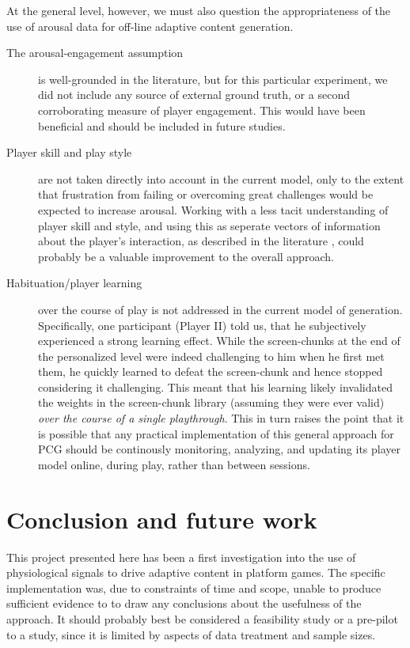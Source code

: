 \documentclass{llncs}
\begin{document}
At the general level, however, we must also question the appropriateness of the use of arousal data for off-line adaptive content generation.
\begin{description}
\item [The arousal-engagement assumption] is well-grounded in the literature, but for this particular experiment, we did not include any source of external ground truth, or a second corroborating measure of player engagement. This would have been beneficial and should be included in future studies.
\item [Player skill and play style] are not taken directly into account in the current model, only to the extent that frustration from failing or overcoming great challenges would be expected to increase arousal. Working with a less tacit understanding of player skill and style, and using this as seperate vectors of information about the player's interaction, as described in the literature \cite{shaker2010towards}, could probably be a valuable improvement to the overall approach.
\item [Habituation/player learning] over the course of play is not addressed in the current model of generation. Specifically, one participant (Player II) told us, that he subjectively experienced a strong learning effect. While the screen-chunks at the end of the personalized level were indeed challenging to him when he first met them, he quickly learned to defeat the screen-chunk and hence stopped considering it challenging. This meant that his learning likely invalidated the weights in the screen-chunk library (assuming they were ever valid) \emph{over the course of a single playthrough}.
This in turn raises the point that it is possible that any practical implementation of this general approach for PCG should be continously monitoring, analyzing, and updating its player model online, during play, rather than between sessions.
\end{description}

\section{Conclusion and future work}
This project presented here has been a first investigation into the use of physiological signals to drive adaptive content in platform games.
The specific implementation was, due to constraints of time and scope, unable to produce sufficient evidence to to draw any conclusions about the usefulness of the approach.
It should probably best be considered a feasibility study or a pre-pilot to a study, since it is limited by aspects of data treatment and sample sizes.
\end{document}
